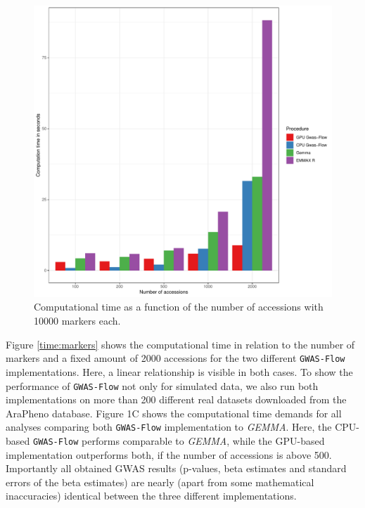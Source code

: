 \begin{figure}[th]
\centering
\includegraphics[height=.55\textheight, width=1.1\textwidth]{Figures/comp_time_gwas}
\decoRule
\caption[Computations time vs accessions]{Computational time as a function of the number of accessions with 10000 markers each.}
\label{fig:time_accessions}
\end{figure}

Figure \ref{time:markers} shows the computational time in relation to the number of markers and a fixed amount
of 2000 accessions for the two different \texttt{GWAS-Flow} implementations. Here, a linear relationship is
visible in both cases. To show the performance of \texttt{GWAS-Flow} not only for simulated data, we also run
both implementations on more than 200 different real datasets downloaded from the AraPheno database. Figure 1C
shows the computational time demands for all analyses comparing both \texttt{GWAS-Flow} implementation to
\textit{GEMMA}. Here, the CPU-based \texttt{GWAS-Flow} performs comparable to \textit{GEMMA}, while the
GPU-based implementation outperforms both, if the number of accessions is above 500. Importantly all obtained
GWAS results (p-values, beta estimates and standard errors of the beta estimates) are nearly (apart from some
mathematical inaccuracies) identical between the three different implementations.

